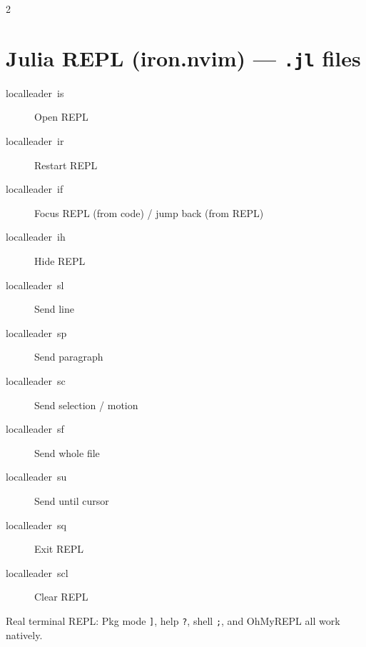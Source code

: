 \documentclass[14pt]{extarticle}
\newcommand{\key}[1]{\colorbox{keybg}{\ttfamily\small\mbox{#1}}}
\begin{document}
\begin{multicols}{2}
\section{Julia REPL (iron.nvim) --- \texttt{.jl} files}
\begin{description}
  \item[\key{localleader is}] Open REPL
  \item[\key{localleader ir}] Restart REPL
  \item[\key{localleader if}] Focus REPL (from code) / jump back (from REPL)
  \item[\key{localleader ih}] Hide REPL
  \item[\key{localleader sl}] Send line
  \item[\key{localleader sp}] Send paragraph
  \item[\key{localleader sc}] Send selection / motion
  \item[\key{localleader sf}] Send whole file
  \item[\key{localleader su}] Send until cursor
  \item[\key{localleader sq}] Exit REPL
  \item[\key{localleader scl}] Clear REPL
\end{description}
{\small\color{note} Real terminal REPL: Pkg mode \texttt{]}, help \texttt{?}, shell \texttt{;}, and OhMyREPL all work natively.}


\end{multicols}
\end{document}
